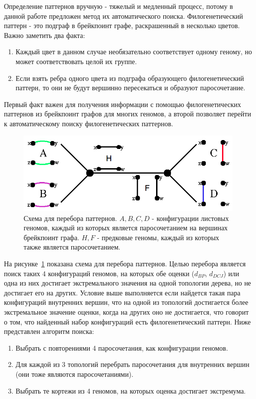 Определение паттернов вручную - тяжелый и медленный процесс, потому в данной работе предложен метод их автоматического поиска.
Филогенетический паттерн - это подграф в брейкпоинт графе, раскрашенный в несколько цветов.
Важно заметить два факта:
\begin{enumerate}
  \item Каждый цвет в данном случае необязательно соответствует одному геному, но может соответствовать целой их группе.
  \item Если взять ребра одного цвета из подграфа образующего филогенетический паттерн, то они не будут вершинно пересекаться и образуют паросочетание.
\end{enumerate}

Первый факт важен для получения информации с помощью филогенетических паттернов из брейкпоинт графов для многих геномов,
а второй позволяет перейти к автоматическому поиску филогенетических паттернов.
\begin{figure}[H]
  \centering
  \includegraphics[max width=0.5\linewidth]{fig/2/automatic_pattern_search.png}
  \caption{Схема для перебора паттернов.
    $A, B, C, D$ - конфигурации листовых геномов, каждый из которых является паросочетанием на вершинах брейкпоинт графа.
    $H, F$ - предковые геномы, каждый из которых также является паросочетанием.}
  \label{fig:automatic_pattern_search}
\end{figure}
На рисунке~\ref{fig:automatic_pattern_search} показана схема для перебора паттернов.
Целью перебора является поиск таких 4 конфигураций геномов, на которых обе оценки ($d_{BP}$, $d_{DCJ}$) или одна из них
достигает экстремального значения на одной топологии дерева, но не достигает его на других.
Условие выше выполняется если найдется такая пара конфигураций внутренних вершин,
что на одной из топологий достигается более экстремальное значение оценки, когда на других оно не достигается,
что говорит о том, что найденный набор конфигураций есть филогенетический паттерн.
Ниже представлен алгоритм поиска:
\begin{enumerate}
  \item Выбрать с повторениями 4 паросочетания, как конфигурации геномов.
  \item Для каждой из 3 топологий перебрать паросочетания для внутренних вершин (они тоже являются паросочетаниями).
  \item Выбрать те кортежи из 4 геномов, на которых оценка достигает экстремума.
\end{enumerate}

